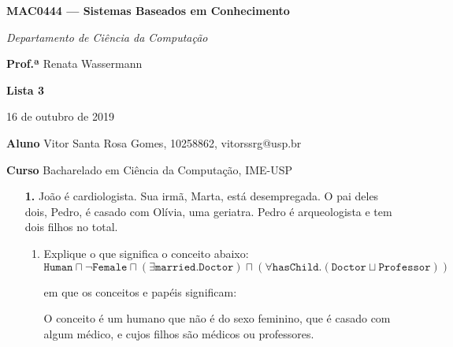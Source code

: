 \documentclass[10pt, twoside]{article}          %
\newcommand{\triple}[4]{%
  \parbox{.333#4}{#1\hfill}%
  \parbox{.333#4}{\hfil#2\hfil}%
  \parbox{.333#4}{\hfill#3}%
}                                               %
\newenvironment{proof*}[1][proof*]              %
  {\proof[#1]\vspace{0.5em}\vspace*{-\baselineskip}
  \hspace{\parindent}\leftskip=.5cm\rightskip=.5cm}
  {\vspace*{-1.5\baselineskip}
  
  \rightskip=0cm\endproof}
\newenvironment{itemize*}[1][,]                 %
  {\begin{itemize}[
    itemindent=\leftskip+\parindent, labelindent=\leftskip+\parindent, 
    wide, topsep=0pt,
    label={\raisebox{-0.5mm}{\scalebox{1.5}{$\bullet$}}}, labelwidth=10pt, labelindent=\leftskip+\parindent, 
    leftmargin=\leftskip, rightmargin=\rightskip,
    #1
  ]}
  {\end{itemize}}
\begin{document}
\begin{multicols*}{2}
\setlength{\columnseprule}{0.4pt}

\begin{center}
  \textbf{\large MAC0444 --- Sistemas Baseados em Conhecimento}

  \textit{Departamento de Ciência da Computação}

  \bigskip
  \triple{\textbf{Prof.ª} Renata Wassermann}{\textbf{Lista 3}}{16 de outubro de 2019}{\columnwidth}

  \bigskip
  {\bf Aluno} Vitor Santa Rosa Gomes, 10258862, vitorssrg@usp.br

  {\bf Curso} Bacharelado em Ciência da Computação, IME-USP
\end{center}

\begin{enumerate}
  \renewcommand{\b}{\overline}
  \newcommand{\s}{\smash}
  \newcommand{\lxor}{\mathbin{\,\underline{\!\vee\!}\,}}

  \item[\textbf{1.}] João é cardiologista. Sua irmã, Marta, está desempregada. O pai deles dois, 
  Pedro, é casado com Olívia, uma geriatra. Pedro é arqueologista e tem dois filhos no total.
  \begin{proof*}[\unskip\nopunct]
    \begin{enumerate}
      \item Explique o que significa o conceito abaixo:
      \[
              \texttt{Human}
        \sqcap\lnot\texttt{Female}
        \sqcap(\exists \texttt{married}.\texttt{Doctor})
        \sqcap(\forall \texttt{hasChild}.(\texttt{Doctor}\sqcup \texttt{Professor}))
      \]
      
      em que os conceitos e papéis significam:

        O conceito é um humano que não é do sexo feminino, que é casado com algum médico, e cujos 
        filhos são médicos ou professores.
      

\end{enumerate}
\end{proof*}
\end{enumerate}
\end{multicols*}
\end{document}
